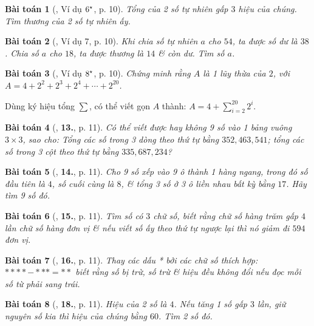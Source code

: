 \documentclass[oneside]{book}
\numberwithin{equation}{section}
\newtheorem{baitoan}{Bài toán}[section]
\begin{document}
\begin{baitoan}[\cite{Binh_Toan_6_tap_1}, Ví dụ $\rm 6^\star$, p. 10]
	Tổng của 2 số tự nhiên gấp $3$ hiệu của chúng. Tìm thương của 2 số tự nhiên ấy.
\end{baitoan}

\begin{baitoan}[\cite{Binh_Toan_6_tap_1}, Ví dụ 7, p. 10]
	Khi chia số tự nhiên $a$ cho $54$, ta được số dư là $38$. Chia số $a$ cho $18$, ta được  thương là $14$ \& còn dư. Tìm số $a$.
\end{baitoan}

\begin{baitoan}[\cite{Binh_Toan_6_tap_1}, Ví dụ $\rm 8^\star$, p. 10]
	Chứng minh rằng $A$ là 1 lũy thừa của $2$, với $A = 4 + 2^2 + 2^3 + 2^4 + \cdots + 2^{20}$.
\end{baitoan}
Dùng ký hiệu tổng $\sum$, có thể viết gọn $A$ thành: $A = 4 + \sum_{i=2}^{20} 2^i$.

\begin{baitoan}[\cite{Binh_Toan_6_tap_1}, \textbf{13.}, p. 11]
	Có thể viết được hay không 9 số vào 1 bảng vuông $3\times 3$, sao cho: Tổng các số trong 3 dòng theo thứ tự bằng $352, 463, 541$; tổng các số trong 3 cột theo thứ tự bằng $335, 687, 234$?
\end{baitoan}

\begin{baitoan}[\cite{Binh_Toan_6_tap_1}, \textbf{14.}, p. 11]
	Cho 9 số xếp vào 9 ô thành 1 hàng ngang, trong đó số đầu tiên là $4$, số cuối cùng là $8$, \& tổng 3 số ở 3 ô liền nhau bất kỳ bằng $17$. Hãy tìm 9 số đó.
\end{baitoan}

\begin{baitoan}[\cite{Binh_Toan_6_tap_1}, \textbf{15.}, p. 11]
	Tìm số có $3$ chữ số, biết rằng chữ số hàng trăm gấp $4$ lần chữ số hàng đơn vị \& nếu viết số ấy theo thứ tự ngược lại thì nó giảm đi $594$ đơn vị.
\end{baitoan}

\begin{baitoan}[\cite{Binh_Toan_6_tap_1}, \textbf{16.}, p. 11]
	Thay các dấu * bởi các chữ số thích hợp: $**** - *** = **$ biết rằng số bị trừ, số trừ \& hiệu đều không đổi nếu đọc mỗi số từ phải sang trái.
\end{baitoan}

\begin{baitoan}[\cite{Binh_Toan_6_tap_1}, \textbf{18.}, p. 11]
	Hiệu của 2 số là $4$. Nếu tăng 1 số gấp $3$ lần, giữ nguyên số kia thì hiệu của chúng bằng $60$. Tìm 2 số đó.
\end{baitoan}
\end{document}
